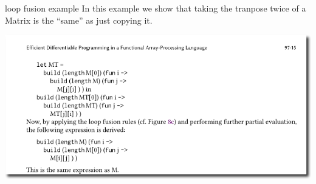 \documentclass[smaller]{beamer}
\begin{document}
\begin{frame}{loop fusion example}
  In this example we show that taking the tranpose twice of
  a Matrix is the ``same'' as just copying it.
  \begin{center}
    \includegraphics[width=.9\linewidth]{matrixtranspose.png}
  \end{center}
\end{frame}
\end{document}
